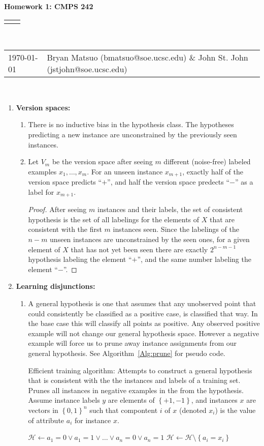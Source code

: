 \documentclass[12pt]{article}
\renewcommand{\title}[1]{\textbf{#1}\\}
\renewcommand{\line}{\begin{tabularx}{\textwidth}{X>{\raggedleft}X}\hline\\\end{tabularx}\\[-0.5cm]}
\newcommand{\leftright}[2]{\begin{tabularx}{\textwidth}{X>{\raggedleft}X}#1%
& #2\\\end{tabularx}\\[-0.5cm]}
\begin{document}
\title{Homework 1: CMPS 242}
\line
\leftright{\today}{Bryan Matsuo (bmatsuo@soe.ucsc.edu) \& John St. John (jstjohn@soe.ucsc.edu)} %
\begin{enumerate}
\item \textbf{Version spaces: }

\begin{enumerate}
\item There is no inductive bias in the hypothesis class. The hypotheses predicting a new instance are unconstrained by the previously seen instances.
\item 
Let $V_m$ be the version space after seeing $m$ different (noise-free) labeled examples $x_1, \dots, x_m$. For an unseen instance $x_{m+1}$, exactly half of the version space predicts ``$+$'', and half the version space predects ``$-$'' as a label for $x_{m+1}$.

\begin{proof}
    After seeing $m$ instances and their labels, the set of consistent hypothesis is the set of all labelings for the elements of $X$ that are consistent with the first $m$ instances seen. Since the labelings of the $n-m$ unseen instances are unconstrained by the seen ones, for a given element of $X$ that has not yet been seen there are exactly $2^{n-m-1}$ hypothesis labeling the element ``$+$'', and the same number labeling the element ``$-$''.
\end{proof}

\end{enumerate}
\item \textbf{ Learning disjunctions: }

\begin{enumerate}
\item A general hypothesis is one that assumes that any unobserved point
that could consistently be classified as a positive case, is classified
that way. In the base case this will classify all points as positive.
Any observed positive example will not change our general hypothesis
space. However a negative example will force us to prune away instance
assignments from our general hypothesis. See Algorithm~\ref{Alg:prune} for pseudo code.
\begin{algorithm}
\caption{
Efficient training algorithm:
Attempts to construct a general hypothesis that is consistent with the the
instances and labels of a training set.
Prunes all instances in negative examples in the from the hypothesis.
Assume instance labels $y$ are elements of $\left\{+1,-1\right\}$,
and instances $x$ are vectors in $\left\{0,1\right\}^n$ such that
compontent $i$ of $x$ (denoted $x_i$) is the value of attribute $a_i$ for instance $x$.
}
\label{Alg:prune}
\begin{algorithmic}
\STATE $\mathcal{H} \gets a_1=0 \vee a_1=1 \vee \ldots \vee a_n=0 \vee a_n=1$
			\STATE $\mathcal{H} \gets \mathcal{H} \setminus \left\{a_i=x_i\right\}$
		\ENDFOR
	\ENDIF
\ENDFOR
\end{algorithmic}
\end{algorithm}


\end{enumerate}
\end{enumerate}
\end{document}
